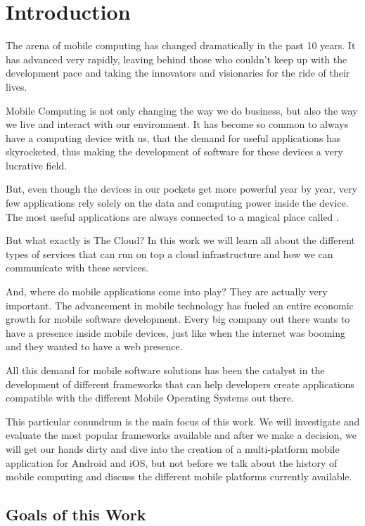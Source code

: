 \chapter{Introduction}\label{ch:introduction}
The arena of mobile computing has changed dramatically in the past 10 years. It has advanced very rapidly, leaving behind those who couldn't keep up with the development pace and taking the innovators and visionaries for the ride of their lives.

Mobile Computing is not only changing the way we do business, but also the way we live and interact with our environment. It has become so common to always have a computing device with us, that the demand for useful applications has skyrocketed, thus making the development of software for these devices a very lucrative field.

But, even though the devices in our pockets get more powerful year by year, very few applications rely solely on the data and computing power inside the device. The most useful applications are always connected to a magical place called .

But what exactly is The Cloud? In this work we will learn all about the different types of services that can run on top a cloud infrastructure and how we can communicate with these services.

And, where do mobile applications come into play? They are actually very important. The advancement in mobile technology has fueled an entire economic growth for mobile software development. Every big company out there wants to have a presence inside mobile devices, just like when the internet was booming and they wanted to have a web presence.

All this demand for mobile software solutions has been the catalyst in the development of different frameworks that can help developers create applications compatible with the different Mobile Operating Systems out there.

This particular conundrum is the main focus of this work. We will investigate and evaluate the most popular frameworks available and after we make a decision, we will get our hands dirty and dive into the creation of a multi-platform mobile application for Android and iOS, but not before we talk about the history of mobile computing and discuss the different mobile platforms currently available.

\section{Goals of this Work}

